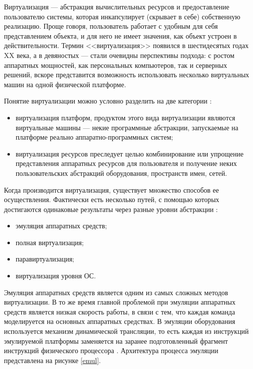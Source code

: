 Виртуализация --- абстракция вычислительных ресурсов и предоставление пользователю системы, которая инкапсулирует (скрывает в себе) собственную реализацию.
Проще говоря, пользователь работает с удобным для себя представлением объекта, и для него не имеет значения, как объект устроен в действительности.
Термин <<виртуализация>> появился в шестидесятых годах XX века, а в девяностых --- стали очевидны перспективы подхода: с ростом аппаратных мощностей, как персональных компьютеров, так и серверных решений, вскоре представится возможность использовать несколько виртуальных машин на одной физической платформе.

Понятие виртуализации можно условно разделить на две категории \cite{ibm-virt}:
\begin{itemize}
  \item виртуализация платформ, продуктом этого вида виртуализации являются виртуальные машины --- некие программные абстракции, запускаемые на платформе реально аппаратно-программных систем;
  \item виртуализация ресурсов преследует целью комбинирование или упрощение представления аппаратных ресурсов для пользователя и получение неких пользовательских абстракций оборудования, пространств имен, сетей.
\end{itemize}

Когда производится виртуализация, существует множество способов ее осуществления.
Фактически есть несколько путей, с помощью которых достигаются одинаковые результаты через разные уровни абстракции \cite{openvz-tutorial}:
\begin{itemize}
  \item эмуляция аппаратных средств;
  \item полная виртуализация;
  \item паравиртуализация;
  \item виртуализация уровня ОС.
\end{itemize}

Эмуляция аппаратных средств является одним из самых сложных методов виртуализации.
В то же время главной проблемой при эмуляции аппаратных средств является низкая скорость работы, в связи с тем, что каждая команда моделируется на основных аппаратных средствах.
В эмуляции оборудования используется механизм динамической трансляции, то есть каждая из инструкций эмулируемой платформы заменяется на заранее подготовленный фрагмент инструкций физического процессора \cite{qemu-ibm}.
Архитектура процесса эмуляции представлена на рисунке \ref{emul}.

